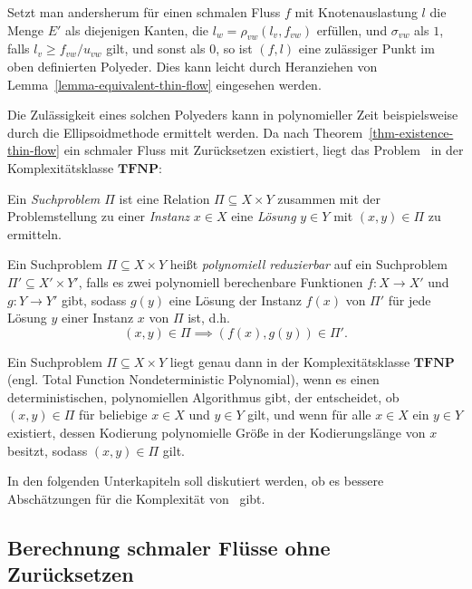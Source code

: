 Setzt man andersherum für einen schmalen Fluss $f$ mit Knotenauslastung $l$ die Menge $E'$ als diejenigen Kanten, die $l_w = \rho_{vw}(l_v, f_{vw})$ erfüllen, und $\sigma_{vw}$ als $1$, falls $l_v \geq f_{vw}/u_{vw}$ gilt, und sonst als $0$, so ist $(f, l)$ eine zulässiger Punkt im oben definierten Polyeder.
Dies kann leicht durch Heranziehen von Lemma~\ref{lemma-equivalent-thin-flow} eingesehen werden.

\newcommand{\TFNP}{\mathbf{TFNP}}

Die Zulässigkeit eines solchen Polyeders kann in polynomieller Zeit beispielsweise durch die Ellipsoidmethode ermittelt werden.
Da nach Theorem~\ref{thm-existence-thin-flow} ein schmaler Fluss mit Zurücksetzen existiert, liegt das Problem \probTFwR\ in der Komplexitätsklasse $\TFNP$:

\begin{definition}[Suchproblem]
	Ein \emph{Suchproblem $\Pi$} ist eine Relation $\Pi\subseteq X \times Y$ zusammen mit der Problemstellung zu einer \emph{Instanz} $x\in X$ eine \emph{Lösung} $y\in Y$ mit $(x,y)\in \Pi$ zu ermitteln.
	
	Ein Suchproblem $\Pi\subseteq X\times Y$ heißt \emph{polynomiell reduzierbar} auf ein Suchproblem $\Pi'\subseteq X'\times Y'$, falls es zwei polynomiell berechenbare Funktionen $f: X\rightarrow X'$ und $g: Y\rightarrow Y'$ gibt, sodass $g(y)$ eine Lösung der Instanz $f(x)$ von $\Pi'$ für jede Lösung $y$ einer Instanz $x$ von $\Pi$ ist, d.h.
	\[ (x,y) \in \Pi \implies (f(x), g(y)) \in \Pi'.\]
\end{definition}
\begin{definition}[Komplexitätsklasse $\TFNP$]
	Ein Suchproblem $\Pi\subseteq X \times Y$ liegt genau dann in der Komplexitätsklasse $\TFNP$ (engl. Total Function Nondeterministic Polynomial), wenn es einen deterministischen, polynomiellen Algorithmus gibt, der entscheidet, ob $(x,y) \in \Pi$ für beliebige $x\in X$ und $y\in Y$ gilt, und wenn für alle $x\in X$ ein $y\in Y$ existiert, dessen Kodierung polynomielle Größe in der Kodierungslänge von $x$ besitzt, sodass $(x, y) \in \Pi$ gilt.
\end{definition}

In den folgenden Unterkapiteln soll diskutiert werden, ob es bessere Abschätzungen für die Komplexität von \probTFwR\ gibt.

\subsection{Berechnung schmaler Flüsse ohne Zurücksetzen}

